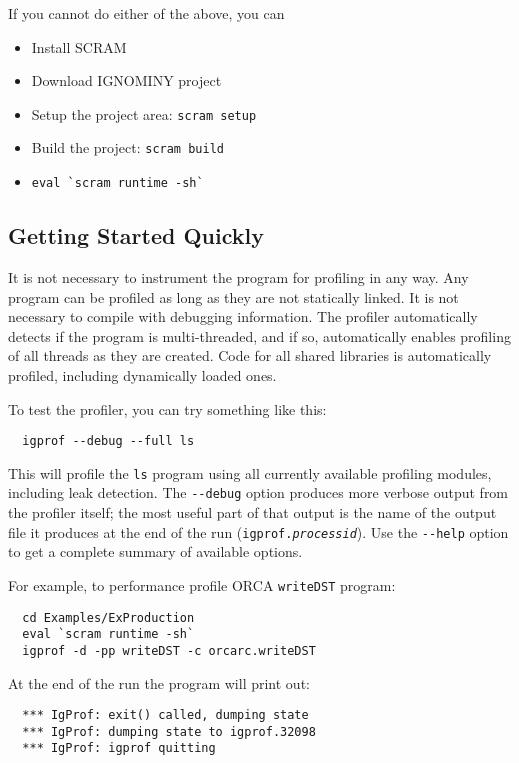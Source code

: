 \documentclass[10pt,a4paper,twocolumn]{article}
\begin{document}
If you cannot do either of the above, you can
\begin{itemize}
  \item Install SCRAM~\cite{scraminstall}
  \item Download IGNOMINY project~\cite{projectdownload}
  \item Setup the project area: \verb|scram setup|
  \item Build the project: \verb|scram build|
  \item \verb|eval `scram runtime -sh`|
\end{itemize}

\subsection{Getting Started Quickly}

It is not necessary to instrument the program for profiling in any
way.  Any program can be profiled as long as they are not statically
linked.  It is not necessary to compile with debugging information.
The profiler automatically detects if the program is multi-threaded,
and if so, automatically enables profiling of all threads as they are
created.  Code for all shared libraries is automatically profiled,
including dynamically loaded ones.

To test the profiler, you can try something like this:
{\small\begin{verbatim}
  igprof --debug --full ls
\end{verbatim}}

This will profile the \verb|ls| program using all currently available
profiling modules, including leak detection.  The \verb|--debug|
option produces more verbose output from the profiler itself; the most
useful part of that output is the name of the output file it produces
at the end of the run (\texttt{igprof.\textit{processid}}).  Use the
\verb|--help| option to get a complete summary of available options.

For example, to performance profile ORCA \verb|writeDST| program:
{\small\begin{verbatim}
  cd Examples/ExProduction
  eval `scram runtime -sh`
  igprof -d -pp writeDST -c orcarc.writeDST
\end{verbatim}}

At the end of the run the program will print out:
{\small\begin{verbatim}
  *** IgProf: exit() called, dumping state
  *** IgProf: dumping state to igprof.32098
  *** IgProf: igprof quitting
\end{verbatim}}
\end{document}
